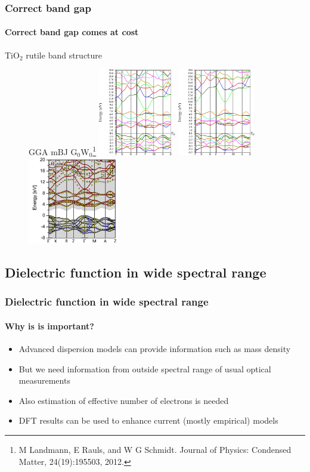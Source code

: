 \documentclass{beamer}
\begin{document}
\begin{frame}
    \frametitle{Correct band gap}
    \framesubtitle{Correct band gap comes at cost}
	TiO$_2$ rutile band structure
	\begin{figure}
	\hspace{0.2cm} GGA \hspace{2.4cm} mBJ \hspace{2.8cm} G$_0$W$_0$\footnote{M Landmann, E Rauls, and W G Schmidt. Journal of Physics: Condensed Matter, 24(19):195503, 2012.}
	\includegraphics[height=3.8cm]{figures/TiO2-rutile-GGA.pdf}
	\includegraphics[height=3.8cm]{figures/TiO2-rutile-mBJ.pdf}
	\includegraphics[height=3.8cm]{figures/TiO2-rutile-GW.png}
	\end{figure}

\end{frame}

\subsection{Dielectric function in wide spectral range}
\begin{frame}
    \frametitle{Dielectric function in wide spectral range}
    \framesubtitle{Why is is important?}

	\begin{itemize}
	\item Advanced dispersion models can provide information such as mass density
	\item But we need information from outside spectral range of usual optical measurements 
	\item Also estimation of effective number of electrons is needed 
	\item DFT results can be used to enhance current (mostly empirical) models
	\end{itemize}	

\end{frame}
\end{document}
